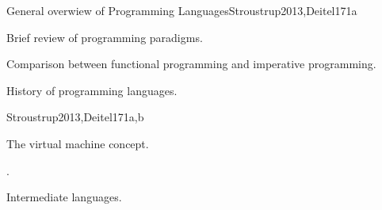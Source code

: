 \begin{syllabus}
\begin{unit}{General overwiew of Programming Languages}{}{Stroustrup2013,Deitel17}{1}{a}
    \begin{topics}
        \item Brief review of programming paradigms.
        \item Comparison between functional programming and imperative programming.
        \item History of programming languages.
    \end{topics}
    \begin{learningoutcomes}
        \item \SPHistoryLODiscussTheForLanguage [\Familiarity]
    \end{learningoutcomes}
\end{unit}

\begin{unit}{\OSVirtualMachines}{}{Stroustrup2013,Deitel17}{1}{a,b}
    \begin{topics}
        \item The virtual machine concept.
        \item \OSVirtualMachinesTopicTypes.
        \item Intermediate languages.
    \end{topics}
    \begin{learningoutcomes}
        \item \OSVirtualMachinesLOExplainTheVirtual [\Familiarity]
        \item \OSVirtualMachinesLODifferentiateEmulation [\Familiarity]
        \item \OSVirtualMachinesLOEvaluateVirtualization [\Assessment]
    \end{learningoutcomes}
\end{unit}


\end{syllabus}
